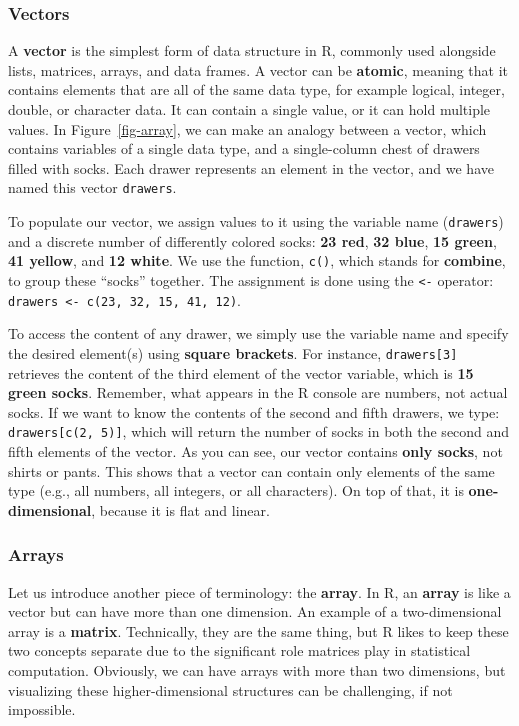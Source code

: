 \subsubsection{Vectors}\label{vectors}

A \textbf{vector} is the simplest form of data structure in R, commonly
used alongside lists, matrices, arrays, and data frames. A vector can be
\textbf{atomic}, meaning that it contains elements that are all of the
same data type, for example logical, integer, double, or character data. It
can contain a single value, or it can hold multiple values. In
Figure~\ref{fig-array}, we can make an analogy between a vector, which
contains variables of a single data type, and a single-column chest of
drawers filled with socks. Each drawer represents an element in the
vector, and we have named this vector \texttt{drawers}.

To populate our vector, we assign values to it using the variable name
(\texttt{drawers}) and a discrete number of differently colored socks:
\textbf{23 red}, \textbf{32 blue}, \textbf{15 green}, \textbf{41
yellow}, and \textbf{12 white}. We use the function, \texttt{c()}, which
stands for \textbf{combine}, to group these ``socks'' together. The
assignment is done using the \texttt{\textless{}-} operator:
\texttt{drawers\ \textless{}-\ c(23,\ 32,\ 15,\ 41,\ 12)}.

To access the content of any drawer, we simply use the variable name and
specify the desired element(s) using \textbf{square brackets}. For
instance, \texttt{drawers{[}3{]}} retrieves the content of the third
element of the vector variable, which is \textbf{15 green socks}.
Remember, what appears in the R console are numbers, not actual socks.
If we want to know the contents of the second and fifth drawers, we
type: \texttt{drawers{[}c(2,\ 5){]}}, which will return the number of
socks in both the second and fifth elements of the vector. As you can
see, our vector contains \textbf{only socks}, not shirts or pants.
This shows that a vector can contain only elements of the same type
(e.g., all numbers, all integers, or all characters). On top of that, it
is \textbf{one-dimensional}, because it is flat and linear.

\subsubsection{Arrays}\label{arrays}

Let us introduce another piece of terminology: the \textbf{array}. In R, an
\textbf{array} is like a vector but can have more than one dimension. An example of a two-dimensional array is a \textbf{matrix}.
Technically, they are the same thing, but R likes to keep these two
concepts separate due to the significant role matrices play in
statistical computation. Obviously, we can have arrays with more than
two dimensions, but visualizing these higher-dimensional structures can
be challenging, if not impossible.

